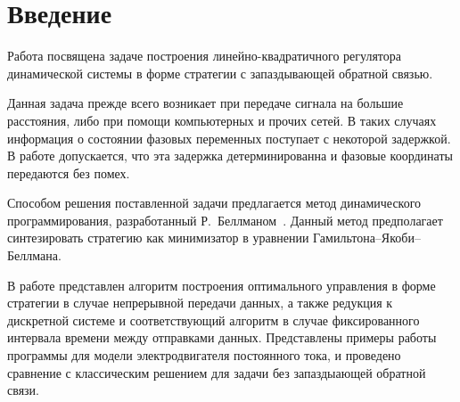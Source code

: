 \section{Введение}

Работа посвящена задаче построения линейно-квадратичного регулятора динамической системы в форме стратегии с запаздывающей обратной связью.

Данная задача прежде всего возникает при передаче сигнала на большие расстояния, либо при помощи компьютерных и прочих сетей.
В таких случаях информация о состоянии фазовых переменных поступает с некоторой задержкой.
В работе допускается, что эта задержка детерминированна и фазовые координаты передаются без помех.

Способом решения поставленной задачи предлагается метод динамического программирования, разработанный Р.~Беллманом~\cite{bellman}.
Данный метод предполагает синтезировать стратегию как минимизатор в уравнении Гамильтона--Якоби--Беллмана.

В работе представлен алгоритм построения оптимального управления в форме стратегии в случае непрерывной передачи данных, а также редукция к дискретной системе и соответствующий алгоритм в случае фиксированного интервала времени между отправками данных.
Представлены примеры работы программы для модели электродвигателя постоянного тока, и проведено сравнение с классическим решением для задачи без запаздыающей обратной связи.
